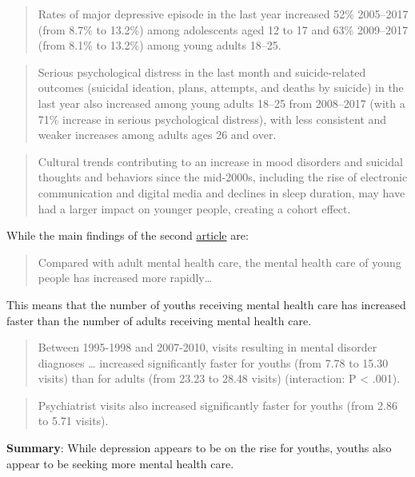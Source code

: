 \documentclass[
]{article}
\begin{document}
\begin{quote}
Rates of major depressive episode in the last year increased 52\%
2005--2017 (from 8.7\% to 13.2\%) among adolescents aged 12 to 17 and
63\% 2009--2017 (from 8.1\% to 13.2\%) among young adults 18--25.
\end{quote}

\begin{quote}
Serious psychological distress in the last month and suicide-related
outcomes (suicidal ideation, plans, attempts, and deaths by suicide) in
the last year also increased among young adults 18--25 from 2008--2017
(with a 71\% increase in serious psychological distress), with less
consistent and weaker increases among adults ages 26 and over.
\end{quote}

\begin{quote}
Cultural trends contributing to an increase in mood disorders and
suicidal thoughts and behaviors since the mid-2000s, including the rise
of electronic communication and digital media and declines in sleep
duration, may have had a larger impact on younger people, creating a
cohort effect.
\end{quote}

While the main findings of the second
\href{https://pubmed.ncbi.nlm.nih.gov/24285382/}{article} are:

\begin{quote}
Compared with adult mental health care, the mental health care of young
people has increased more rapidly\ldots{}
\end{quote}

This means that the number of youths receiving mental health care has
increased faster than the number of adults receiving mental health care.

\begin{quote}
Between 1995-1998 and 2007-2010, visits resulting in mental disorder
diagnoses \ldots{} increased significantly faster for youths (from 7.78
to 15.30 visits) than for adults (from 23.23 to 28.48 visits)
(interaction: P \textless{} .001).
\end{quote}

\begin{quote}
Psychiatrist visits also increased significantly faster for youths (from
2.86 to 5.71 visits).
\end{quote}

\textbf{Summary}: While depression appears to be on the rise for youths,
youths also appear to be seeking more mental health care.
\end{document}
